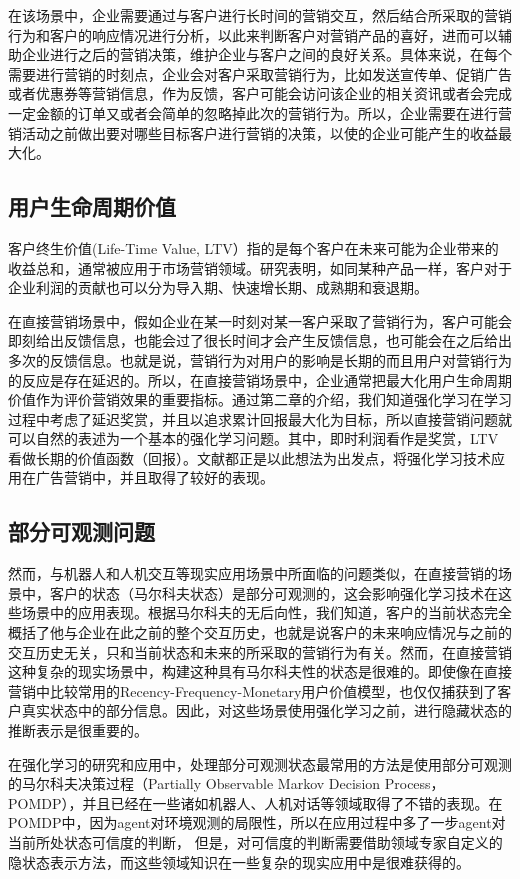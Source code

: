 在该场景中，企业需要通过与客户进行长时间的营销交互，然后结合所采取的营销行为和客户的响应情况进行分析，以此来判断客户对营销产品的喜好，进而可以辅助企业进行之后的营销决策，维护企业与客户之间的良好关系。具体来说，在每个需要进行营销的时刻点，企业会对客户采取营销行为，比如发送宣传单、促销广告或者优惠券等营销信息，作为反馈，客户可能会访问该企业的相关资讯或者会完成一定金额的订单又或者会简单的忽略掉此次的营销行为。所以，企业需要在进行营销活动之前做出要对哪些目标客户进行营销的决策，以使的企业可能产生的收益最大化。

\subsection{用户生命周期价值}
客户终生价值(Life-Time Value, LTV）指的是每个客户在未来可能为企业带来的收益总和，通常被应用于市场营销领域。研究表明，如同某种产品一样，客户对于企业利润的贡献也可以分为导入期、快速增长期、成熟期和衰退期。

在直接营销场景中，假如企业在某一时刻对某一客户采取了营销行为，客户可能会即刻给出反馈信息，也能会过了很长时间才会产生反馈信息，也可能会在之后给出多次的反馈信息。也就是说，营销行为对用户的影响是长期的而且用户对营销行为的反应是存在延迟的。所以，在直接营销场景中，企业通常把最大化用户生命周期价值作为评价营销效果的重要指标。通过第二章的介绍，我们知道强化学习在学习过程中考虑了延迟奖赏，并且以追求累计回报最大化为目标，所以直接营销问题就可以自然的表述为一个基本的强化学习问题。其中，即时利润看作是奖赏，LTV看做长期的价值函数（回报）。文献\citep{tkachenko2015autonomous,pednault2002sequential,silver2013concurrent}都正是以此想法为出发点，将强化学习技术应用在广告营销中，并且取得了较好的表现。

\subsection{部分可观测问题}
然而，与机器人和人机交互等现实应用场景中所面临的问题类似，在直接营销的场景中，客户的状态（马尔科夫状态）是部分可观测的，这会影响强化学习技术在这些场景中的应用表现。根据马尔科夫的无后向性，我们知道，客户的当前状态完全概括了他与企业在此之前的整个交互历史，也就是说客户的未来响应情况与之前的交互历史无关，只和当前状态和未来的所采取的营销行为有关。然而，在直接营销这种复杂的现实场景中，构建这种具有马尔科夫性的状态是很难的。即使像在直接营销中比较常用的Recency-Frequency-Monetary用户价值模型\citep{tkachenko2015autonomous}，也仅仅捕获到了客户真实状态中的部分信息。因此，对这些场景使用强化学习之前，进行隐藏状态的推断表示是很重要的。

在强化学习的研究和应用中，处理部分可观测状态最常用的方法是使用部分可观测的马尔科夫决策过程（Partially Observable Markov  Decision Process，POMDP）\citep{kaelbling1998planning}，并且已经在一些诸如机器人、人机对话等领域取得了不错的表现\citep{pineau2003point,williams2007partially}。在POMDP中，因为agent对环境观测的局限性，所以在应用过程中多了一步agent对当前所处状态可信度的判断，
但是，对可信度的判断需要借助领域专家自定义的隐状态表示方法，而这些领域知识在一些复杂的现实应用中是很难获得的。

